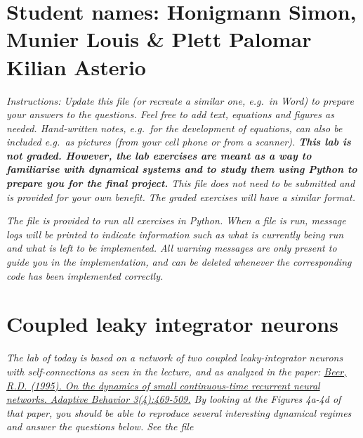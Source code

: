 \documentclass{cmc}
\begin{document}
\pagestyle{fancy}
 

\section*{Student names: Honigmann Simon, Munier Louis \& Plett Palomar Kilian Asterio}

\textit{Instructions: Update this file (or recreate a similar one, e.g.\ in
  Word) to prepare your answers to the questions. Feel free to add text,
  equations and figures as needed. Hand-written notes, e.g.\ for the development
  of equations, can also be included e.g.\ as pictures (from your cell phone or
  from a scanner).  \textbf{This lab is not graded. However, the lab exercises
    are meant as a way to familiarise with dynamical systems and to study them
    using Python to prepare you for the final project.} This file does not need
  to be submitted and is provided for your own benefit. The graded exercises
  will have a similar format.}

\textit{The file  is provided to run all exercises in Python.
  When a file is run, message logs will be printed to indicate information such
  as what is currently being run and what is left to be implemented. All
  warning messages are only present to guide you in the implementation, and can
  be deleted whenever the corresponding code has been implemented correctly.}


\section*{Coupled leaky integrator neurons}

\textit{The lab of today is based on a network of two coupled leaky-integrator
  neurons with self-connections as seen in the lecture, and as analyzed in the
  paper:
  \href{https://journals.sagepub.com/doi/10.1177/105971239500300405}{Beer,
    R.D. (1995). On the dynamics of small continuous-time recurrent neural
    networks. Adaptive Behavior 3(4):469-509.} By looking at the Figures 4a-4d
  of that paper, you should be able to reproduce several interesting dynamical
  regimes and answer the questions below. See the file }
\end{document}
